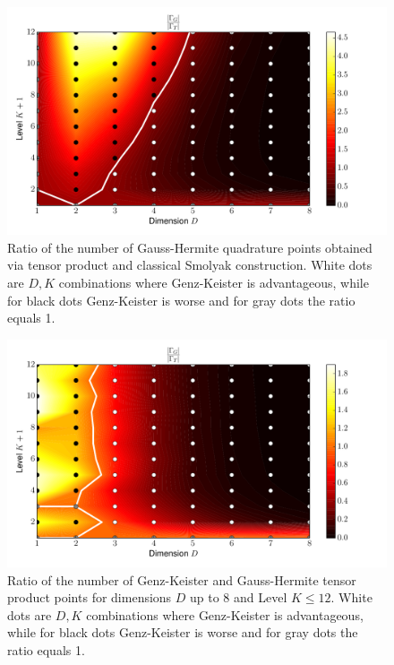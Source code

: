\documentclass[a4paper,10pt]{article}
\begin{document}
\begin{figure}[h]
  \centering
  \includegraphics[width=0.8\linewidth]{./img/gk_hermitephy_tensor_ratio.pdf}
  \caption{Ratio of the number of Gauss-Hermite quadrature points obtained
  via tensor product and classical Smolyak construction. White dots are $D,K$
  combinations where Genz-Keister is advantageous, while for black dots
  Genz-Keister is worse and for gray dots the ratio equals 1.}
  \label{fig:gk_hermitephy_tensor_ratio}
\end{figure}

\begin{figure}[h]
  \centering
  \includegraphics[width=0.8\linewidth]{./img/gk_hermitephy_ratio.pdf}
  \caption{Ratio of the number of Genz-Keister and Gauss-Hermite tensor product
  points for dimensions $D$ up to 8 and Level $K \leq 12$. White dots are $D,K$
  combinations where Genz-Keister is advantageous, while for black dots
  Genz-Keister is worse and for gray dots the ratio equals 1.}
  \label{fig:gk_hermitephy_ratio}
\end{figure}
\end{document}
